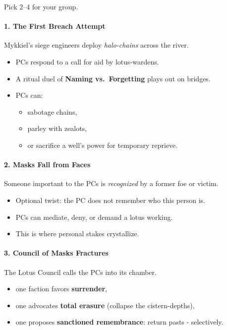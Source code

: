 \documentclass[11pt]{article}
\newcommand{\Term}[1]{\textbf{#1}}
\begin{document}
Pick 2--4 for your group.

\paragraph{1. The First Breach Attempt}
Mykkiel's siege engineers deploy \emph{halo-chains} across the river.
\begin{itemize}[leftmargin=*]
  \item PCs respond to a call for aid by lotus-wardens.
  \item A ritual duel of \Term{Naming vs.\ Forgetting} plays out on bridges.
  \item PCs can:
  \begin{itemize}[leftmargin=*]
    \item sabotage chains,
    \item parley with zealots,
    \item or sacrifice a well's power for temporary reprieve.
  \end{itemize}
\end{itemize}

\paragraph{2. Masks Fall from Faces}
Someone important to the PCs is \emph{recognized} by a former foe or victim.
\begin{itemize}[leftmargin=*]
  \item Optional twist: the PC does not remember who this person is.
  \item PCs can mediate, deny, or demand a lotus working.
  \item This is where personal stakes crystallize.
\end{itemize}

\paragraph{3. Council of Masks Fractures}
The Lotus Council calls the PCs into its chamber.
\begin{itemize}[leftmargin=*]
  \item one faction favors \textbf{surrender},
  \item one advocates \textbf{total erasure} (collapse the cistern-depths),
  \item one proposes \textbf{sanctioned remembrance}: return pasts - selectively.
\end{itemize}
\end{document}
